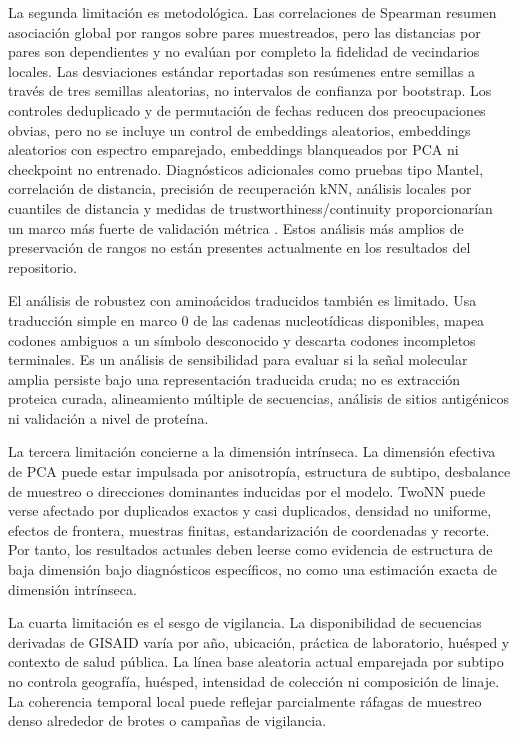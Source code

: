\documentclass[11pt]{article}
\begin{document}
La segunda limitación es metodológica. Las correlaciones de Spearman resumen asociación global por rangos sobre pares muestreados, pero las distancias por pares son dependientes y no evalúan por completo la fidelidad de vecindarios locales. Las desviaciones estándar reportadas son resúmenes entre semillas a través de tres semillas aleatorias, no intervalos de confianza por bootstrap. Los controles deduplicado y de permutación de fechas reducen dos preocupaciones obvias, pero no se incluye un control de embeddings aleatorios, embeddings aleatorios con espectro emparejado, embeddings blanqueados por PCA ni checkpoint no entrenado. Diagnósticos adicionales como pruebas tipo Mantel, correlación de distancia, precisión de recuperación kNN, análisis locales por cuantiles de distancia y medidas de trustworthiness/continuity proporcionarían un marco más fuerte de validación métrica \cite{mantel1967detection,szekely2007distance,lee2009quality}. Estos análisis más amplios de preservación de rangos no están presentes actualmente en los resultados del repositorio.

El análisis de robustez con aminoácidos traducidos también es limitado. Usa traducción simple en marco 0 de las cadenas nucleotídicas disponibles, mapea codones ambiguos a un símbolo desconocido y descarta codones incompletos terminales. Es un análisis de sensibilidad para evaluar si la señal molecular amplia persiste bajo una representación traducida cruda; no es extracción proteica curada, alineamiento múltiple de secuencias, análisis de sitios antigénicos ni validación a nivel de proteína.

La tercera limitación concierne a la dimensión intrínseca. La dimensión efectiva de PCA puede estar impulsada por anisotropía, estructura de subtipo, desbalance de muestreo o direcciones dominantes inducidas por el modelo. TwoNN puede verse afectado por duplicados exactos y casi duplicados, densidad no uniforme, efectos de frontera, muestras finitas, estandarización de coordenadas y recorte. Por tanto, los resultados actuales deben leerse como evidencia de estructura de baja dimensión bajo diagnósticos específicos, no como una estimación exacta de dimensión intrínseca.

La cuarta limitación es el sesgo de vigilancia. La disponibilidad de secuencias derivadas de GISAID varía por año, ubicación, práctica de laboratorio, huésped y contexto de salud pública. La línea base aleatoria actual emparejada por subtipo no controla geografía, huésped, intensidad de colección ni composición de linaje. La coherencia temporal local puede reflejar parcialmente ráfagas de muestreo denso alrededor de brotes o campañas de vigilancia.
\end{document}
